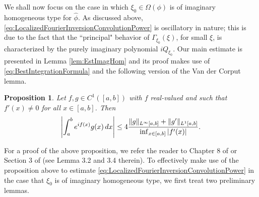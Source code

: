 \documentclass[11pt, letter]{book}
\newtheorem{proposition}[theorem]{Proposition}
\begin{document}
\noindent We shall now focus on the case in which $\xi_0\in\Omega(\phi)$ is of imaginary homogeneous type for $\widehat{\phi}$. As discussed above,  \eqref{eq:LocalizedFourierInversionConvolutionPower} is oscillatory in nature; this is due to the fact that the ``principal" behavior of $\Gamma_{\xi_0}(\xi)$, for small $\xi$, is characterized by the purely imaginary polynomial $iQ_{\xi_0}$. Our main estimate is presented in Lemma \ref{lem:EstImagHom} and its proof makes use of \eqref{eq:BestIntegrationFormula} and the following version of the Van der Corput lemma.

\begin{framed}
\begin{proposition}\label{prop:VanderCorput}
Let $f,g\in C^1([a,b])$ with $f$ real-valued and such that $f'(x)\neq 0$ for all $x\in [a,b]$. Then
\begin{equation*}
\abs{\int_a^b e^{if(x)}g(x)\,dx}\leq 4\frac{\|g\|_{L^\infty[a,b]}+\|g'\|_{L^1[a,b]}}{\inf_{x\in[a,b]}\abs{f'(x)}}.
\end{equation*}
\end{proposition}
\end{framed}

\noindent For a proof of the above proposition, we refer the reader to Chapter 8 of \cite{stein_harmonic_1993} or Section 3 of \cite{randles_convolution_2015} (see Lemma 3.2 and 3.4 therein).  To effectively make use of the proposition above to estimate \eqref{eq:LocalizedFourierInversionConvolutionPower} in the case that $\xi_0$ is of imaginary homogeneous type, we first treat two preliminary lemmas. 
\end{document}
